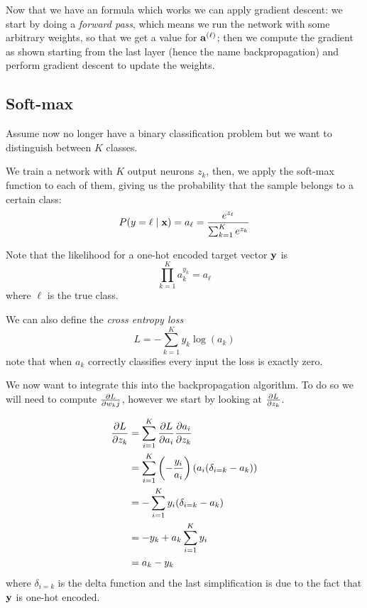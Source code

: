 \documentclass[12pt]{extarticle}
\renewcommand{\vec}[1]{\bvec{#1}}
\begin{document}
Now that we have an formula which works we can apply gradient descent: we start by doing a
\emph{forward pass}, which means we run the network with some arbitrary weights, so that we get a
value for $\vec a^{(\ell)}$; then we compute the gradient as shown starting from the last layer
(hence the name backpropagation) and perform gradient descent to update the weights.

\subsection{Soft-max}

Assume now no longer have a binary classification problem but we want to distinguish between $K$
classes.

We train a network with $K$ output neurons $z_k$, then, we apply the soft-max function to each of
them, giving us the probability that the sample belongs to a certain class:
\begin{equation}
	P(y = \ell \mid \vec x) = a_\ell = \frac {e^{z_\ell}}{\sum_{k = 1}^{K} e^{z_k}}
\end{equation}

Note that the likelihood for a one-hot encoded target vector $\vec y$ is
\begin{equation}
	\prod_{k = 1}^K a^{y_k}_k = a_\ell
\end{equation}
where $\ell$ is the true class.

We can also define the \emph{cross entropy loss}
\begin{equation}
	L = - \sum_{k = 1}^{K} y_k \log (a_k)
\end{equation}
note that when $a_k$ correctly classifies every input the loss is exactly zero.

We now want to integrate this into the backpropagation algorithm. To do so we will need to compute
$\pdv{L}{w_kj}$, however we start by looking at $\pdv{L}{z_k}$.

\begin{align}
	\pdv{L}{z_k} & = \sum_{i = 1}^{K} \pdv{L}{a_i} \pdv{a_i}{z_k}                                                \\
	             & = \sum_{i = 1}^{K} \left( - \frac{y_i}{a_i} \right) \left( a_i (\delta_{i = k} - a_k) \right) \\
	             & = - \sum_{i = 1}^{K} y_i (\delta_{i = k} - a_k)                                               \\
	             & = - y_k + a_k \sum_{i = 1}^{K} y_i                                                            \\
	             & = a_k - y_k
\end{align}
where $\delta_{i = k}$ is the delta function and the last simplification is due to the fact that
$\vec y$ is one-hot encoded.
\end{document}
